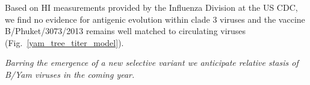 \documentclass[11pt,oneside,letterpaper]{article}
\newcommand{\FIG}[1]{Fig.~\ref{#1}}
\begin{document}
Based on HI measurements provided by the Influenza Division at the US
CDC, we find no evidence for antigenic evolution within clade 3 viruses
and the vaccine B/Phuket/3073/2013 remains well matched to circulating
viruses (\FIG{yam_tree_titer_model}).

\emph{Barring the emergence of a new selective variant we anticipate
relative stasis of B/Yam viruses in the coming year.}

\clearpage
\pagebreak



\end{document}
